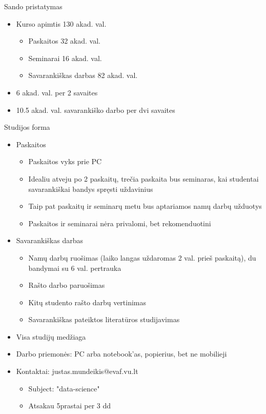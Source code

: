 \documentclass[11pt,xcolor=table]{beamer}
\begin{document}
\begin{frame}{Sando pristatymas}
\begin{itemize}
\item Kurso apimtis 130 akad. val.
\begin{itemize}
\item Paskaitos 32 akad. val.
\item Seminarai 16 akad. val.
\item Savarankiškas darbas 82 akad. val.
\end{itemize}
\item 6 akad. val. per 2 savaites
\item 10.5 akad. val. savarankiško darbo per dvi savaites
\end{itemize}
\end{frame}

\begin{frame}{Studijos forma}
\begin{itemize}
\item Paskaitos
\begin{itemize}
\item Paskaitos vyks prie PC
\item Idealiu atveju po 2 paskaitų, trečia paskaita bus seminaras, kai studentai savarankiškai bandys spręsti uždavinius
\item Taip pat paskaitų ir seminarų metu bus aptariamos namų darbų užduotys
\item Paskaitos ir seminarai nėra privalomi, bet rekomenduotini
\end{itemize}
\item Savarankiškas darbas
\begin{itemize}
\item Namų darbų ruošimas (laiko langas uždaromas 2 val. prieš paskaitą), du bandymai su 6 val. pertrauka
\item Rašto darbo paruošimas
\item Kitų studento rašto darbų vertinimas
\item Savarankiškas pateiktos literatūros studijavimas
\end{itemize}
\end{itemize}
\end{frame}


\begin{frame}
\begin{itemize}
\item Visa studijų medžiaga \href{https://github.com/justasmundeikis/duomenu_analizes_ivadas}{\color{blue}{Github}}
\item Darbo priemonės: PC arba notebook'as,  popierius, bet ne mobilieji
\item Kontaktai: justas.mundeikis@evaf.vu.lt
\begin{itemize}
\item Subject: "data-science"
\item Atsakau 5prastai per 3 dd
\end{itemize}
\end{itemize}
\end{frame}
\end{document}
